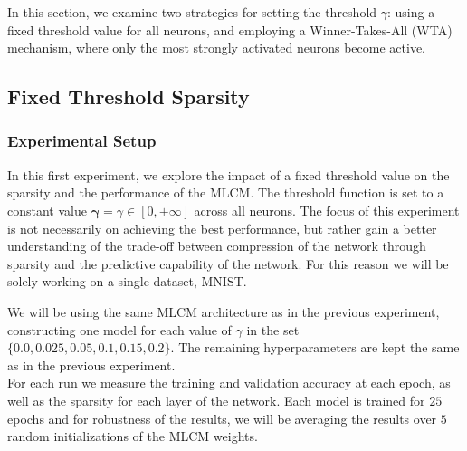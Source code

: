 \documentclass[a4paper,12pt]{report}
\begin{document}
In this section, we examine two strategies for setting the threshold $\gamma$: using 
a fixed threshold value for all neurons, and employing a Winner-Takes-All (WTA) 
mechanism, where only the most strongly activated neurons become active.

\subsection{Fixed Threshold Sparsity}
\subsubsection*{Experimental Setup}
In this first experiment, we explore the impact of a fixed threshold value on the 
sparsity and the performance of the MLCM. The threshold function is set to a constant 
value $\boldsymbol{\gamma} = \gamma \in \left[0, +\infty\right]$ across all neurons. The focus of this experiment 
is not necessarily on achieving the best performance, but rather gain a better 
understanding of the trade-off between compression of the network through sparsity and 
the predictive capability of the network. For this reason we will be solely working on 
a single dataset, MNIST.
\vspace*{0.5em}

We will be using the same MLCM architecture as in the previous experiment, constructing 
one model for each value of $\gamma$ in the set $\{0.0, 0.025, 0.05, 0.1, 
0.15, 0.2\}$. The remaining hyperparameters are kept the same as in the previous 
experiment. \\
For each run we measure the training and validation accuracy at each epoch, as well as 
the sparsity for each layer of the network. Each model is trained for $25$ epochs and 
for robustness of the results, we will be averaging the results over $5$ random 
initializations of the MLCM weights.
\end{document}
